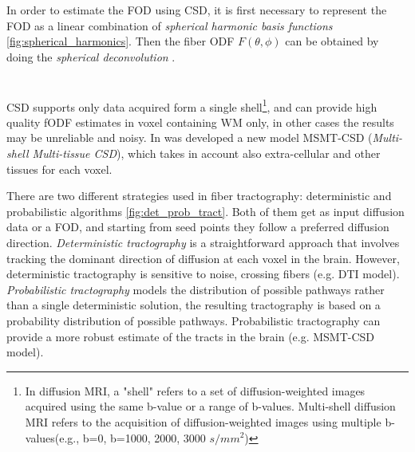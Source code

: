   \noindent In order to estimate the FOD using CSD, it is first necessary to represent the FOD as a linear combination of \emph{spherical harmonic basis functions} \ref{fig:spherical_harmonics}. Then the fiber ODF $F(\theta, \phi)$ can be obtained by doing the \emph{spherical deconvolution} \cite{healy1998spherical}. 
 \\\\\\
 \noindent CSD supports only data acquired form a single shell\footnote{In diffusion MRI, a "shell" refers to a set of diffusion-weighted images acquired using the same b-value or a range of b-values. Multi-shell diffusion MRI refers to the acquisition of diffusion-weighted images using multiple b-values(e.g., b=0, b=1000, 2000, 3000 $s/mm^2$)}, and can provide high quality fODF estimates in voxel containing WM only, in other cases the results may be unreliable and noisy. In \cite{jeurissen2014multi} was developed a new model MSMT-CSD (\emph{Multi-shell Multi-tissue CSD}), which takes in account also extra-cellular and other tissues for each voxel.

 There are two different strategies used in fiber tractography: deterministic and probabilistic algorithms \ref{fig:det_prob_tract}. Both of them get as input diffusion data or a FOD, and starting from seed points they follow a preferred diffusion direction. \emph{Deterministic tractography} is a straightforward approach that involves tracking the dominant direction of diffusion at each voxel in the brain. However, deterministic tractography is sensitive to noise, crossing fibers (e.g. DTI model). \emph{Probabilistic tractography} models the distribution of possible pathways rather than a single deterministic solution, the resulting tractography is based on a probability distribution of possible pathways. Probabilistic tractography can provide a more robust estimate of the tracts in the brain (e.g. MSMT-CSD model). \cite{behrens2007probabilistic}

